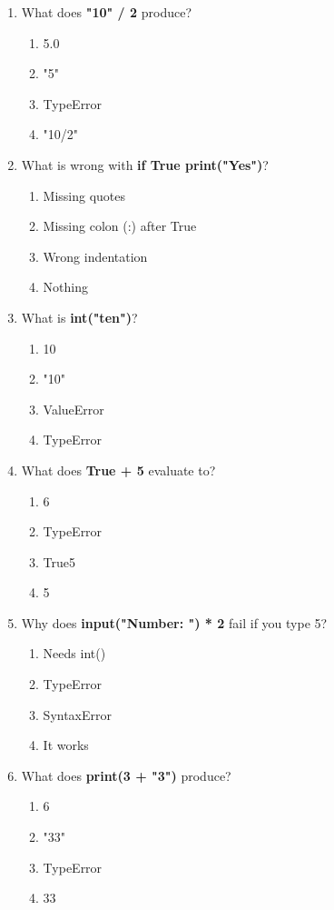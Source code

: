 \documentclass{article}
\begin{document}
\begin{multicols*}{4}
\begin{enumerate}
        \item What does \textbf{"10" / 2} produce?
        \begin{enumerate}[label=(\Alph*)]
            \item 5.0
            \item "5"
            \item TypeError
            \item "10/2"
        \end{enumerate}

        \item What is wrong with \textbf{if True print("Yes")}?
        \begin{enumerate}[label=(\Alph*)]
            \item Missing quotes
            \item Missing colon (:) after True
            \item Wrong indentation
            \item Nothing
        \end{enumerate}

        \item What is \textbf{int("ten")}?
        \begin{enumerate}[label=(\Alph*)]
            \item 10
            \item "10"
            \item ValueError
            \item TypeError
        \end{enumerate}

        \item What does \textbf{True + 5} evaluate to?
        \begin{enumerate}[label=(\Alph*)]
            \item 6
            \item TypeError
            \item True5
            \item 5
        \end{enumerate}

        \item Why does \textbf{input("Number: ") * 2} fail if you type 5?
        \begin{enumerate}[label=(\Alph*)]
            \item Needs int()
            \item TypeError
            \item SyntaxError
            \item It works
        \end{enumerate}
        \item What does \textbf{print(3 + "3")} produce?
        \begin{enumerate}[label=(\Alph*)]
            \item 6
            \item "33"
            \item TypeError
            \item 33
        \end{enumerate}


\end{enumerate}
\end{multicols*}
\end{document}
